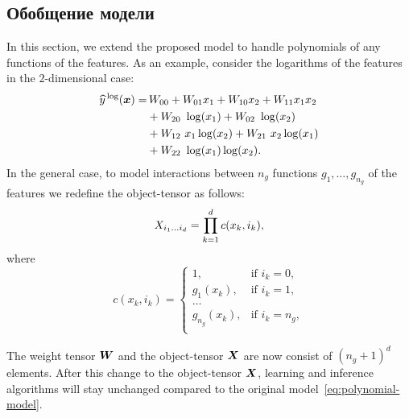 \subsection{Обобщение модели \label{sec:exm-model-extension}}
In this section, we extend the proposed model to handle polynomials of any functions of the features.
As an example, consider the logarithms of the features in the $2$-dimensional case:
\begin{equation*}
  \begin{aligned}
    \widehat{y}^{\,\log}(\boldsymbol{x}) =& \,W_{00} + W_{01} x_1 +W_{10} x_2 + W_{11} x_1 x_2\\
    &+W_{20} \,\, \log(x_1) + W_{02} \,\, \log(x_2)\\
    &+ W_{12} \,\, x_1 \log(x_2)+ W_{21} \,\, x_2 \log(x_1)\\
    &+ W_{22} \,\, \log(x_1) \log(x_2).
  \end{aligned}
\end{equation*}
In the general case, to model interactions between $n_g$ functions $g_1, \ldots, g_{n_g}$ of the features we redefine the object-tensor as follows:
\begin{equation*}
X_{i_1 \ldots i_d} = \prod_{k=1}^d c(x_k, i_k),
\end{equation*}
where
\begin{equation*}
c(x_k, i_k) =
\begin{cases}
1, & \text{if } i_k = 0,\\
g_1(x_k), & \text{if } i_k = 1,\\
\ldots\\
g_{n_g}(x_k), & \text{if } i_k = n_g,\\
\end{cases}
\end{equation*}

The weight tensor $\boldsymbol{W}$ and the object-tensor $\boldsymbol{X}$ are now consist of $(n_g + 1)^d$ elements.
After this change to the object-tensor $\boldsymbol{X}$, learning and inference algorithms will stay unchanged compared to the original model~\eqref{eq:polynomial-model}.

